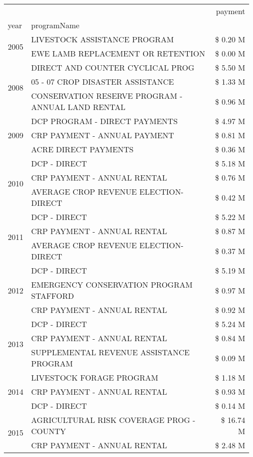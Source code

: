 \begin{tabular}{llr}
\toprule
 &  & payment \\
year & programName &  \\
\midrule
\multirow[t]{2}{*}{2005} & LIVESTOCK ASSISTANCE PROGRAM & \$ 0.20 M \\
 & EWE LAMB REPLACEMENT OR RETENTION & \$ 0.00 M \\
\cline{1-3}
\multirow[t]{3}{*}{2008} & DIRECT AND COUNTER CYCLICAL PROG & \$ 5.50 M \\
 & 05 - 07 CROP DISASTER ASSISTANCE & \$ 1.33 M \\
 & CONSERVATION RESERVE PROGRAM - ANNUAL LAND RENTAL & \$ 0.96 M \\
\cline{1-3}
\multirow[t]{3}{*}{2009} & DCP PROGRAM - DIRECT PAYMENTS & \$ 4.97 M \\
 & CRP PAYMENT - ANNUAL PAYMENT & \$ 0.81 M \\
 & ACRE DIRECT PAYMENTS & \$ 0.36 M \\
\cline{1-3}
\multirow[t]{3}{*}{2010} & DCP - DIRECT & \$ 5.18 M \\
 & CRP PAYMENT - ANNUAL RENTAL & \$ 0.76 M \\
 & AVERAGE CROP REVENUE ELECTION-DIRECT & \$ 0.42 M \\
\cline{1-3}
\multirow[t]{3}{*}{2011} & DCP - DIRECT & \$ 5.22 M \\
 & CRP PAYMENT - ANNUAL RENTAL & \$ 0.87 M \\
 & AVERAGE CROP REVENUE ELECTION-DIRECT & \$ 0.37 M \\
\cline{1-3}
\multirow[t]{3}{*}{2012} & DCP - DIRECT & \$ 5.19 M \\
 & EMERGENCY CONSERVATION PROGRAM STAFFORD & \$ 0.97 M \\
 & CRP PAYMENT - ANNUAL RENTAL & \$ 0.92 M \\
\cline{1-3}
\multirow[t]{3}{*}{2013} & DCP - DIRECT & \$ 5.24 M \\
 & CRP PAYMENT - ANNUAL RENTAL & \$ 0.84 M \\
 & SUPPLEMENTAL REVENUE ASSISTANCE PROGRAM & \$ 0.09 M \\
\cline{1-3}
\multirow[t]{3}{*}{2014} & LIVESTOCK FORAGE PROGRAM & \$ 1.18 M \\
 & CRP PAYMENT - ANNUAL RENTAL & \$ 0.93 M \\
 & DCP - DIRECT & \$ 0.14 M \\
\cline{1-3}
\multirow[t]{3}{*}{2015} & AGRICULTURAL RISK COVERAGE PROG - COUNTY & \$ 16.74 M \\
 & CRP PAYMENT - ANNUAL RENTAL & \$ 2.48 M \\

\end{tabular}
